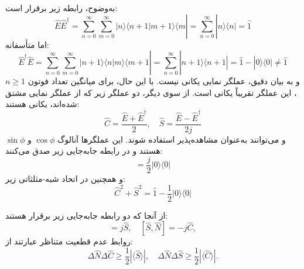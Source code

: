 به‌وضوح، رابطه زیر برقرار است:
\begin{equation}
	\hat{E} \hat{E}^\dagger = \sum_{n=0}^{\infty} \sum_{m=0}^{\infty} |n\rangle \langle n+1 | m+1 \rangle \langle m| = \sum_{n=0}^{\infty} |n\rangle \langle n| = \hat{1}
	\label{eq:11-15}
\end{equation}
اما متأسفانه:
\begin{equation}
	\hat{E}^\dagger \hat{E} = \sum_{n=0}^{\infty} \sum_{m=0}^{\infty} |n+1\rangle \langle n | m \rangle \langle m+1| = \sum_{n=0}^{\infty} |n+1\rangle \langle n+1| = \hat{1} - |0\rangle \langle 0| \neq \hat{1}
	\label{eq:11-16}
\end{equation}
و به بیان دقیق، عملگر نمایی یکانی نیست. با این حال، برای میانگین تعداد فوتون $n \geq 1$، این عملگر تقریباً یکانی است. از سوی دیگر، دو عملگر زیر که از عملگر نمایی مشتق شده‌اند، یکانی هستند:
\begin{equation}
	\hat{C} = \frac{\hat{E} + \hat{E}^\dagger}{2}, \quad \hat{S} = \frac{\hat{E} - \hat{E}^\dagger}{2j}
	\label{eq:11-17}
\end{equation}
و می‌توانند به‌عنوان مشاهده‌پذیر استفاده شوند. این عملگرها آنالوگ $\cos \phi$ و $\sin \phi$ هستند و در رابطه جابه‌جایی زیر صدق می‌کنند:
\begin{equation}
	[\hat{C}, \hat{S}] = \frac{j}{2} |0\rangle \langle 0|
	\label{eq:11-18}
\end{equation}
و همچنین در اتحاد شبه-مثلثاتی زیر:
\begin{equation}
	\hat{C}^2 + \hat{S}^2 = \hat{1} - \frac{1}{2} |0\rangle \langle 0|
	\label{eq:11-19}
\end{equation}

از آنجا که دو رابطه جابه‌جایی زیر برقرار هستند:
\begin{equation}
	[\hat{C}, \hat{N}] = j\hat{S}, \quad [\hat{S}, \hat{N}] = -j\hat{C},
	\label{eq:11-20}
\end{equation}
روابط عدم قطعیت متناظر عبارتند از:
\begin{equation}
	\Delta\hat{N} \Delta\hat{C} \geq \frac{1}{2} |\langle \hat{S} \rangle|, \quad \Delta\hat{N} \Delta\hat{S} \geq \frac{1}{2} |\langle \hat{C} \rangle|.
	\label{eq:11-21}
\end{equation}

